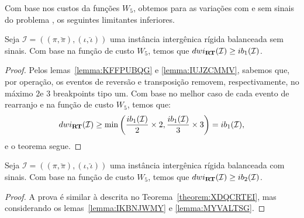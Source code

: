 Com base nos custos da funções $W_5$, obtemos para as variações com e sem sinais do problema \SbWIRT{}, os seguintes limitantes inferiores.

\begin{theorem}\label{theorem:XDQCRTEI}
Seja $\mathcal{I} = ((\pi,\breve\pi),(\iota,\breve\iota))$ uma instância intergênica rígida balanceada sem sinais. Com base na função de custo $W_5$, temos que $dwi_{\textbf{RT}}(\mathcal{I}) \ge ib_1(\mathcal{I})$.
\begin{proof}
Pelos lemas~\ref{lemma:KFFPUBQG} e \ref{lemma:IUJZCMMV}, sabemos que, por operação, os eventos de reversão e transposição removem, respectivamente, no máximo $2$e $3$ breakpoints tipo um. Com base no melhor caso de cada evento de rearranjo e na função de custo $W_5$, temos que:
$$dwi_{\textbf{RT}}(\mathcal{I}) \ge \min\left(\frac{ib_1(\mathcal{I})}{2} \times 2,\frac{ib_1(\mathcal{I})}{3} \times 3\right) = ib_1(\mathcal{I}),$$ e o teorema segue.
\end{proof}
\end{theorem}

\begin{theorem}\label{theorem:MCKFPIOP}
Seja $\mathcal{I} = ((\pi,\breve\pi),(\iota,\breve\iota))$ uma instância intergênica rígida balanceada com sinais. Com base na função de custo $W_5$, temos que $dwi_{\textbf{RT}}(\mathcal{I}) \ge ib_2(\mathcal{I})$.
\begin{proof}
A prova é similar à descrita no Teorema~\ref{theorem:XDQCRTEI}, mas considerando os lemas~\ref{lemma:IKBNJWMY} e \ref{lemma:MYVALTSG}.
\end{proof}
\end{theorem}

